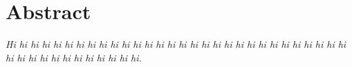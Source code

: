 
\chapter*{Abstract}\label{abstract}

\textit{Hi hi hi hi hi hi hi hi hi hi hi hi hi hi hi hi hi hi hi hi hi hi hi hi hi hi hi hi hi hi hi hi hi hi hi hi hi hi hi hi hi hi.}